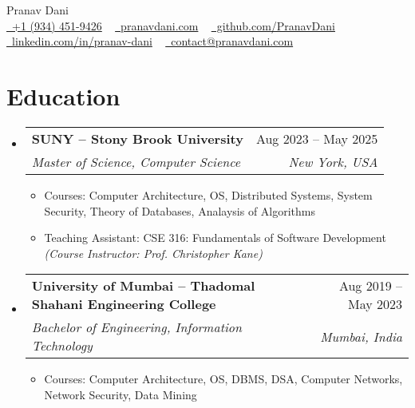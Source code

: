 \documentclass[letterpaper,11pt]{article}
\makeatletter
\newcommand{\resumeItem}[1]{
  \item\small{
    {#1 \vspace{-2pt}}
  }
}
\newcommand{\resumeSubheading}[4]{
  \vspace{-2pt}\item
    \begin{tabular*}{1.0\textwidth}[t]{l@{\extracolsep{\fill}}r}
      \vspace{-2pt}\textbf{#1} & \small #2 \\
      \textit{\small#3} & \textit{\small #4} \\
    \end{tabular*}\vspace{-7pt}
}
\newcommand{\resumeSubHeadingListStart}{\begin{itemize}[leftmargin=0.0in, label={}]}
\newcommand{\resumeSubHeadingListEnd}{\end{itemize}}
\newcommand{\resumeItemListStart}{\begin{itemize}}
\newcommand{\resumeItemListEnd}{\end{itemize}\vspace{-5pt}}
\makeatother
\begin{document}

\begin{center}
  {\huge Pranav Dani} \\ \vspace{4pt}
  \small
  \faMobile
  \href{tel:+19344529426}{\raisebox{-0.2\height}\ +1 (934) 451-9426} ~
  \faGlobe \href{https://pranavdani.com}{\raisebox{-0.1\height}\ pranavdani.com} ~
  \faGithub \href{https://github.com/PranavDani}{\raisebox{-0.2\height}\  github.com/PranavDani} ~
  \faLinkedin \href{https://linkedin.com/in/pranav-dani}{\raisebox{-0.2\height}\  linkedin.com/in/pranav-dani} ~
  \faEnvelope \href{mailto:contact@pranavdani.com}{\raisebox{-0.2\height}\    contact@pranavdani.com}
  \vspace{-10pt}
\end{center}


\section{Education}
\resumeSubHeadingListStart
\resumeSubheading
{SUNY -- Stony Brook University}{Aug 2023 -- May 2025}
{Master of Science, Computer Science }{New York, USA}
\resumeItemListStart
\resumeItem{Courses: Computer Architecture, OS, Distributed Systems, System Security, Theory of Databases, Analaysis of Algorithms}
\vspace{-2pt}
\resumeItem{Teaching Assistant: CSE 316: Fundamentals of Software Development \textit{(Course Instructor: Prof. Christopher Kane)}}
\resumeItemListEnd
\vspace{-3pt}

\resumeSubheading
{University of Mumbai -- Thadomal Shahani Engineering College}{Aug 2019 -- May 2023}
{Bachelor of Engineering, Information Technology}{Mumbai, India}
\resumeItemListStart
\resumeItem{Courses: Computer Architecture, OS, DBMS, DSA, Computer Networks, Network Security, Data Mining}
\resumeItemListEnd
\resumeSubHeadingListEnd
\vspace{-18pt}
\end{document}
